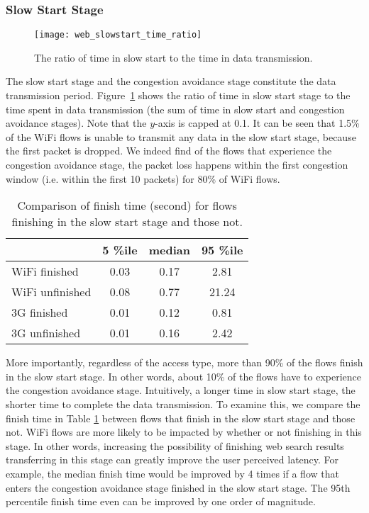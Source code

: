 \subsubsection{Slow Start Stage}

\begin{figure}[th]
\centering
\texttt{[image: web\_slowstart\_time\_ratio]}
\caption{The ratio of time in slow start to the time in data transmission.}
\label{fig:web_ss_time_ratio}
\end{figure}

The slow start stage and the congestion avoidance stage constitute the data transmission period. Figure~\ref{fig:web_ss_time_ratio} shows the ratio of time in slow start stage to the time spent in data transmission (\ie the sum of time in slow start and congestion avoidance stages). Note that the $y$-axis is capped at 0.1. It can be seen that 1.5\% of the WiFi flows is unable to transmit any data in the slow start stage, because the first packet is dropped. We indeed find of the flows that experience the congestion avoidance stage, the packet loss happens within the first congestion window (i.e. within the first 10 packets) for 80\% of WiFi flows.

\begin{table}[th]
\caption{Comparison of finish time (second) for flows finishing in the slow start stage and those not.}
\label{tab:web_finish_time_3rd_stage}
\centering
\renewcommand{\arraystretch}{1.0}

\begin{tabular}{l|c|c|c}
\hline
& 5 \%ile & median & 95 \%ile \\
\hline
WiFi finished & 0.03 & 0.17 & 2.81 \\
WiFi unfinished & 0.08 & 0.77 & 21.24 \\

\hline
3G finished & 0.01 & 0.12 & 0.81 \\
3G unfinished & 0.01 & 0.16 & 2.42 \\

\hline
\end{tabular}
\end{table}

More importantly, regardless of the access type, more than 90\% of the flows finish in the slow start stage. In other words, about 10\% of the flows have to experience the congestion avoidance stage. Intuitively, a longer time in slow start stage, the shorter time to complete the data transmission. To examine this, we compare the finish time in Table \ref{tab:web_finish_time_3rd_stage} between flows that finish in the slow start stage and those not. WiFi flows are more likely to be impacted by whether or not finishing in this stage. In other words, increasing the possibility of finishing web search results transferring in this stage can greatly improve the user perceived latency. For example, the median finish time would be improved by 4 times if a flow that enters the congestion avoidance stage finished in the slow start stage. The 95th percentile finish time even can be improved by one order of magnitude. 



